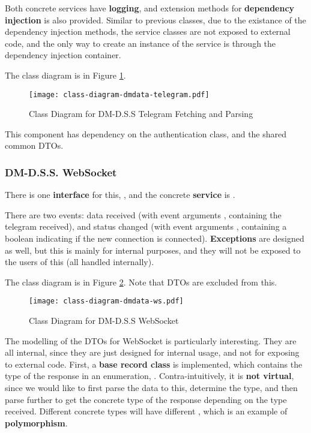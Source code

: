 Both concrete services have \textbf{logging}, and extension methods for \textbf{dependency injection} is also provided. Similar to previous classes, due to the existance of the dependency injection methods, the service classes are not exposed to external code, and the only way to create an instance of the service is through the dependency injection container.

The class diagram is in Figure \ref{fig:class-diagram-dmdata-telegram}.

\begin{figure}[htp]
    \centering
    \texttt{[image: class-diagram-dmdata-telegram.pdf]}
    \caption{Class Diagram for DM-D.S.S Telegram Fetching and Parsing}
    \label{fig:class-diagram-dmdata-telegram}
\end{figure}

This component has dependency on the authentication class, and the shared common DTOs.

\subsubsection{DM-D.S.S. WebSocket}

There is one \textbf{interface} for this, , and the concrete \textbf{service} is .

There are two events: data received (with event arguments , containing the telegram received), and status changed (with event arguments , containing a boolean indicating if the new connection is connected). \textbf{Exceptions} are designed as well, but this is mainly for internal purposes, and they will not be exposed to the users of this (all handled internally).

The class diagram is in Figure \ref{fig:class-diagram-dmdata-ws}. Note that DTOs are excluded from this.

\begin{figure}[htp]
    \centering
    \texttt{[image: class-diagram-dmdata-ws.pdf]}
    \caption{Class Diagram for DM-D.S.S WebSocket}
    \label{fig:class-diagram-dmdata-ws}
\end{figure}


The modelling of the DTOs for WebSocket is particularly interesting. They are all internal, since they are just designed for internal usage, and not for exposing to external code. First, a \textbf{base record class}  is implemented, which contains the type of the response in an enumeration, . Contra-intuitively, it is \textbf{not virtual}, since we would like to first parse the data to this, determine the type, and then parse further to get the concrete type of the response depending on the type received. Different concrete types will have different , which is an example of \textbf{polymorphism}.

